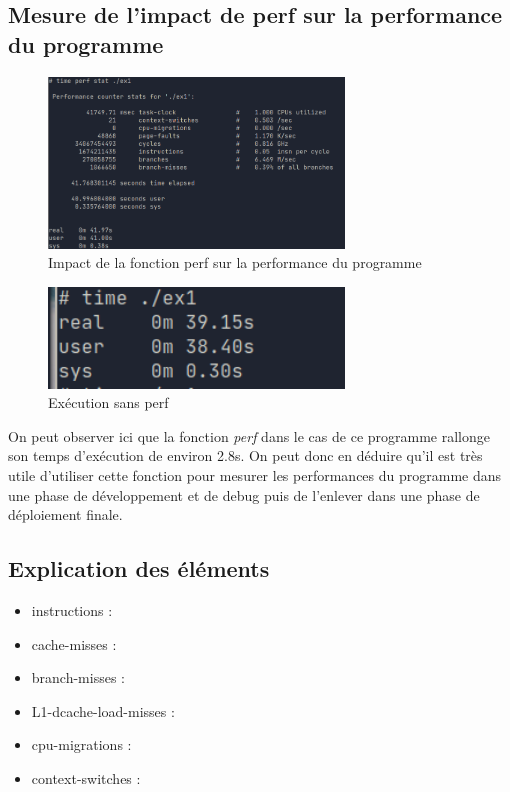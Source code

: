 \documentclass{ReportTemplate}
\begin{document}
\subsection{Mesure de l'impact de perf sur la performance du programme}
\begin{figure}[H]
    \centering
    \includegraphics[width=0.7\textwidth]{imageSources/time_with_perf.png}
    \caption{Impact de la fonction perf sur la performance du programme}
    \label{fig:perfImpact}
\end{figure}
\begin{figure}[H]
    \centering
    \includegraphics[width=0.7\textwidth]{imageSources/time_without_perf.png}
    \caption{Exécution sans perf}
    \label{fig:perfImpact2}
\end{figure}
On peut observer ici que la fonction \textit{perf} dans le cas de ce programme
rallonge son temps d'exécution de environ 2.8s. On peut donc en déduire qu'il
est très utile d'utiliser cette fonction pour mesurer les performances du
programme dans une phase de développement et de debug puis de l'enlever dans une
phase de déploiement finale. \newpage
\subsection{Explication des éléments}
\begin{itemize}
    \item instructions :
    \item cache-misses :
    \item branch-misses :
    \item L1-dcache-load-misses :
    \item cpu-migrations :
    \item context-switches :
\end{itemize}
\end{document}
